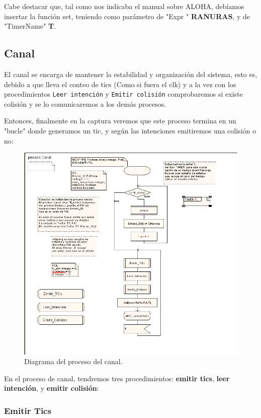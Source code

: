 \documentclass{article}
\begin{document}
\quad

Cabe destacar que, tal como nos indicaba el manual sobre ALOHA, debíamos insertar la función set, teniendo como parámetro de "\(\)Expr " \textbf{RANURAS}, y de "TimerName" \textbf{T}.
\subsection{Canal}

El canal se encarga de mantener la estabilidad y organización del sistema, esto es, debido a que lleva el conteo de tics (Como si fuera el clk) y a la vez con los procedimientos \verb|Leer intención| y \verb|Emitir colisión| comprobaremos si existe colisión y se lo comunicaremos a los demás procesos.

\quad

Entonces, finalmente en la captura veremos que este proceso termina en un "bucle" donde generamos un tic, y según las intenciones emitiremos una colisión o no:

\begin{figure}[h]
    \centering
    \includegraphics[width=0.8\linewidth]{src/proceso canal.png}
    \caption{\label{fig:canalproceso} Diagrama del proceso del canal.}
\end{figure}


En el proceso de canal, tendremos tres procedimientos: \textbf{emitir tics}, \textbf{leer intención}, y \textbf{emitir colisión}:

\subsubsection{Emitir Tics}
\end{document}
